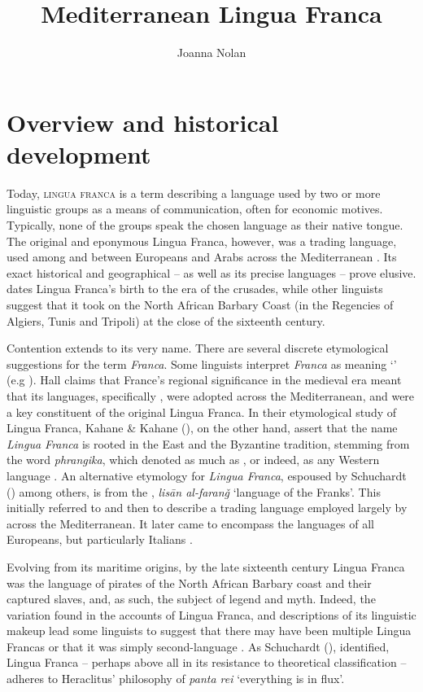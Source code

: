 \documentclass[output=paper]{langsci/langscibook}
\title{Mediterranean Lingua Franca}
\author{Joanna Nolan\affiliation{SOAS University of London}}
\begin{document}
	
\section{Overview and historical development}
	
	Today, \textsc{lingua franca} is a term describing a language used by two or more linguistic groups as a means of communication, often for economic motives. Typically, none of the groups speak the chosen language as their native tongue. The original and eponymous Lingua Franca, however, was a trading language, used among and between Europeans and Arabs across the Mediterranean \citep{KahaneKahane1976}. Its exact historical and geographical  – as well as its precise  languages – prove elusive. \citet{Hall1966} dates Lingua Franca’s birth to the era of the crusades, while other linguists \citep{Cifoletti2004,Minervini1996} suggest that it took  on the North African Barbary Coast (in the Regencies of Algiers, Tunis and Tripoli) at the close of the sixteenth century. 
	
	Contention extends to its very name. There are several discrete etymological suggestions for the term \textit{Franca}.  Some linguists interpret \textit{Franca} as meaning ‘’ (e.g \citealt[3]{Hall1966}). Hall claims that France’s regional significance in the medieval era meant that its languages, specifically , were adopted across the Mediterranean, and were a key constituent of the original Lingua Franca. In their etymological study of Lingua Franca, Kahane \& Kahane (\citeyear[25]{KahaneKahane1976}), on the other hand, assert that the name \textit{Lingua Franca} is rooted in the East and the Byzantine tradition, stemming from the  word \textit{phrangika}, which denoted  as much as , or indeed, as any Western language \citep[31]{KahaneKahane1976}. An alternative etymology for \textit{Lingua Franca}, espoused by Schuchardt (\citeyear[74]{Schuchardt1909}) among others, is from the , \textit{lisān al-faranǧ} ‘language of the Franks’. This initially referred to  and then to describe a trading language employed largely by  across the Mediterranean. It later came to encompass the languages of all Europeans, but particularly Italians \citep[26]{KahaneKahane1976}.  
	
	Evolving from its maritime origins, by the late sixteenth century Lingua Franca was the language of pirates of the North African Barbary coast and their captured slaves, and, as such, the subject of legend and myth. Indeed, the variation found in the accounts of Lingua Franca, and descriptions of its linguistic makeup lead some linguists \citep{Minervini1996,Mori2016} to suggest that there may have been multiple Lingua Francas or that it was simply second-language . As Schuchardt (\citeyear[88]{Schuchardt1909}), identified, Lingua Franca – perhaps above all in its resistance to theoretical classification – adheres to Heraclitus’ philosophy of \textit{panta rei}  ‘everything is in flux’. 
	
\end{document}
